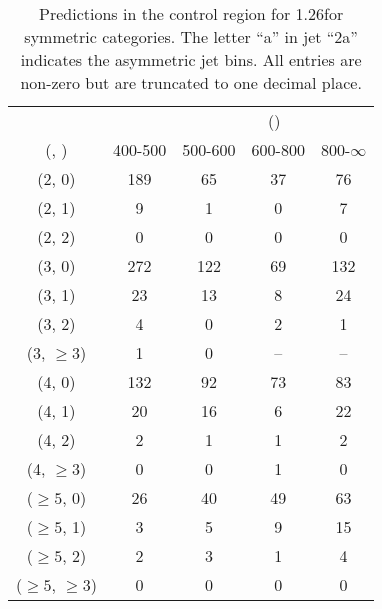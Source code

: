 \begin{table}[h!]
\tiny
\centering
\caption{Predictions in the \gj control region for 1.26\ifb for symmetric categories. The letter ``a'' in jet \eg ``2a''  indicates the asymmetric jet bins. All entries are non-zero but are truncated to one decimal place.\label{tab:predsep_data_gj_sym}}
\begin{tabular}
{ccccc}
	\hline\hline
&	& \multicolumn{4}{c}{\scalht (\gev)} \\ 
	 (\njet,  \nb) & 400-500 & 500-600 & 600-800 & 800-$\infty$ \\ [0.8ex] 
\hline
	(2, 0) & 189 & 65 & 37 & 76 \\[0.5ex] 
	(2, 1) & 9 & 1 & 0 & 7 \\[0.5ex] 
	(2, 2) & 0 & 0 & 0 & 0 \\[0.5ex] 
	(3, 0) & 272 & 122 & 69 & 132 \\[0.5ex] 
	(3, 1) & 23 & 13 & 8 & 24 \\[0.5ex] 
	(3, 2) & 4 & 0 & 2 & 1 \\[0.5ex] 
	(3, $\ge3$) & 1 & 0 & -- & -- \\[0.5ex] 
	(4, 0) & 132 & 92 & 73 & 83 \\[0.5ex] 
	(4, 1) & 20 & 16 & 6 & 22 \\[0.5ex] 
	(4, 2) & 2 & 1 & 1 & 2 \\[0.5ex] 
	(4, $\ge3$) & 0 & 0 & 1 & 0 \\[0.5ex] 
	($\ge5$, 0) & 26 & 40 & 49 & 63 \\[0.5ex] 
	($\ge5$, 1) & 3 & 5 & 9 & 15 \\[0.5ex] 
	($\ge5$, 2) & 2 & 3 & 1 & 4 \\[0.5ex] 
	($\ge5$, $\ge3$) & 0 & 0 & 0 & 0 \\[0.5ex] 
	\hline
	\hline
\end{tabular}
\end{table}
